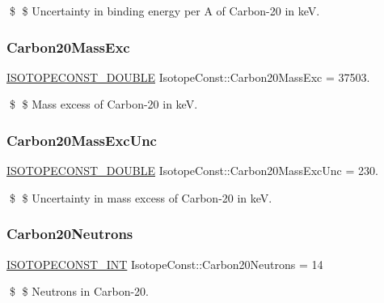 \$ \$ Uncertainty in binding energy per A of Carbon-\/20 in keV. \mbox{\label{group___isotope_const-_carbon-_c20_ga8394b77c4368deb0c1f97a360525793d}} 
\subsubsection{\texorpdfstring{Carbon20\+Mass\+Exc}{Carbon20MassExc}}
{\footnotesize\ttfamily \mbox{\hyperlink{group___isotope_const-_macros_ga8f45a7272ce02c0b4c65c44636ed719a}{I\+S\+O\+T\+O\+P\+E\+C\+O\+N\+S\+T\+\_\+\+D\+O\+U\+B\+LE}} Isotope\+Const\+::\+Carbon20\+Mass\+Exc = 37503.}

\$ \$ Mass excess of Carbon-\/20 in keV. \mbox{\label{group___isotope_const-_carbon-_c20_gacb50c11663ba9f8fe069973b6019097d}} 
\subsubsection{\texorpdfstring{Carbon20\+Mass\+Exc\+Unc}{Carbon20MassExcUnc}}
{\footnotesize\ttfamily \mbox{\hyperlink{group___isotope_const-_macros_ga8f45a7272ce02c0b4c65c44636ed719a}{I\+S\+O\+T\+O\+P\+E\+C\+O\+N\+S\+T\+\_\+\+D\+O\+U\+B\+LE}} Isotope\+Const\+::\+Carbon20\+Mass\+Exc\+Unc = 230.}

\$ \$ Uncertainty in mass excess of Carbon-\/20 in keV. \mbox{\label{group___isotope_const-_carbon-_c20_ga69c25bf306c7016838fe740de2a0df38}} 
\subsubsection{\texorpdfstring{Carbon20\+Neutrons}{Carbon20Neutrons}}
{\footnotesize\ttfamily \mbox{\hyperlink{group___isotope_const-_macros_ga5f18360b3e99483a35c32d789e62621c}{I\+S\+O\+T\+O\+P\+E\+C\+O\+N\+S\+T\+\_\+\+I\+NT}} Isotope\+Const\+::\+Carbon20\+Neutrons = 14}

\$ \$ Neutrons in Carbon-\/20. \mbox{\label{group___isotope_const-_carbon-_c20_ga5d8c93e810f494ff4dc2d5b1c1ad090b}} 
